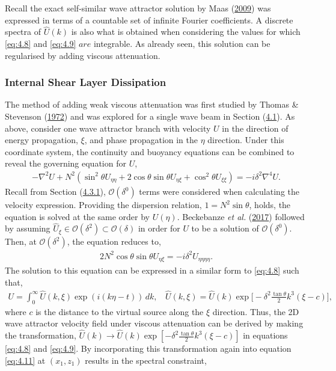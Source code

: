 \documentclass[a4paper]{article}
\numberwithin{equation}{section}
\begin{document}
Recall the exact self-similar wave attractor solution by Maas (\hyperlink{ref 20}{2009}) was expressed in terms of a countable set of infinite Fourier coefficients. A discrete spectra of $\hat{U}(k)$ is also what is obtained when considering the values for which \eqref{eq:4.8} and \eqref{eq:4.9} $are$ integrable. As already seen, this solution can be regularised by adding viscous attenuation. 

\subsubsection{Internal Shear Layer Dissipation}
The method of adding weak viscous attenuation was first studied by Thomas \& Stevenson (\hyperlink{ref 21}{1972}) and was explored for a single wave beam in Section (\hyperref[sec:4.1]{4.1}). As above, consider one wave attractor branch with velocity $U$ in the direction of energy propagation, $\xi$, and phase propagation in the $\eta$ direction. Under this coordinate system, the continuity and buoyancy equations can be combined to reveal the governing equation for $U$,
\begin{align*}
-\nabla^2U + N^2(\sin^2\theta U_{\eta\eta} + 2\cos\theta\sin\theta U_{\eta\xi} + \cos^2\theta U_{\xi\xi}) = - i\delta^2 \nabla^4U.
\end{align*}
Recall from Section (\hyperref[sec:4.3.1]{4.3.1}), $\mathcal{O}(\delta^0)$ terms were considered when calculating the velocity expression. Providing the dispersion relation, $1 = N^2\sin\theta$, holds, the equation is solved at the same order by $U(\eta)$. Beckebanze \emph{et al.} (\hyperlink{ref 8}{2017}) followed by assuming $\hat{U}_\xi \in \mathcal{O}(\delta^2) \subset \mathcal{O}(\delta)$ in order for $U$ to be a solution of $\mathcal{O}(\delta^0)$. Then, at $\mathcal{O}(\delta^2)$, the equation reduces to, 
\begin{align*}
2N^2\cos\theta\sin\theta U_{\eta\xi} = - i\delta^2 U_{\eta\eta\eta\eta}.
\end{align*}
The solution to this equation can be expressed in a similar form to \eqref{eq:4.8} such that, 
\begin{align}\label{eq:4.12}
U = \int_{0}^{\infty} \hat{U}(k, \xi) \exp (i(k\eta - t)) \,dk,~~~~ \hat{U}(k,\xi) = \hat{U}(k)\exp\bigg[-\delta^2 \frac{\tan\theta}{2}k^3(\xi - c)\bigg],
\end{align}
where $c$ is the distance to the virtual source along the $\xi$ direction. Thus, the 2D wave attractor velocity field under viscous attenuation can be derived by making the transformation, $\hat{U}(k) \rightarrow \hat{U}(k)\exp[-\delta^2 \frac{\tan\theta}{2}k^3(\xi - c)]$ in equations \eqref{eq:4.8} and \eqref{eq:4.9}. By incorporating this transformation again into equation \eqref{eq:4.11} at $(x_1,z_1)$ results in the spectral constraint, 
\end{document}
